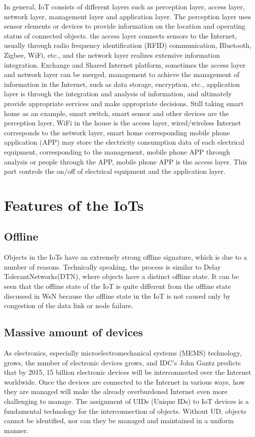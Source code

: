 \documentclass[a4paper,11pt]{article}
\begin{document}
In general, IoT consists of different layers such as perception layer, access layer, network layer, management layer and application layer. The perception layer uses sensor elements or devices to provide information on the location and operating status of connected objects. the access layer connects sensors to the Internet, usually through radio frequency identification (RFID) communication, Bluetooth, Zigbee, WiFi, etc., and the network layer realizes extensive information integration. Exchange and Shared Internet platform, sometimes the access layer and network layer can be merged, management to achieve the management of information in the Internet, such as data storage, encryption, etc., application layer is through the integration and analysis of information, and ultimately provide appropriate services and make appropriate decisions. Still taking smart home as an example, smart switch, smart sensor and other devices are the perception layer, WiFi in the house is the access layer, wired/wireless Internet corresponds to the network layer, smart home corresponding mobile phone application (APP) may store the electricity consumption data of each electrical equipment, corresponding to the management, mobile phone APP through analysis or people through the APP, mobile phone APP is the access layer. This part controls the on/off of electrical equipment and the application layer.

\section{Features of the IoTs}
\subsection{Offline}
Objects in the IoTs have an extremely strong offline signature, which is due to a number of reasons. Technically speaking, the process is similar to Delay TolerantNetworks(DTN)\cite{vasilakos2016delay}, where objects have a distinct offline state. It can be seen that the offline state of the IoT is quite different from the offline state discussed in WsN because the offline state in the IoT is not caused only by congestion of the data link or node failure.

\subsection{Massive amount of devices}
As electronics, especially microelectromechanical systems (MEMS) technology, grows, the number of electronic devices grows, and IDC's John Gantz predicts that by 2015, 15 billion electronic devices will be interconnected over the Internet worldwide. Once the devices are connected to the Internet in various ways, how they are managed will make the already overburdened Internet even more challenging to manage. The assignment of UIDs (Unique IDs) to IoT devices is a fundamental technology for the interconnection of objects. Without UD, objects cannot be identified, nor can they be managed and maintained in a uniform manner.
\end{document}
